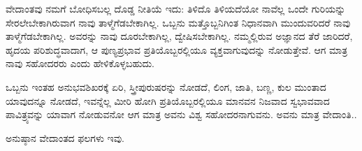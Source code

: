 ವೇದಾಂತವು ನಮಗೆ ಬೋಧಿಸಬಲ್ಲ ದೊಡ್ಡ ನೀತಿಯೆ ಇದು: ತಿಳಿದೊ ತಿಳಿಯದೆಯೋ ನಾವೆಲ್ಲ ಒಂದೇ ಗುರಿಯನ್ನು ಸೇರಲೇಬೇಕಾಗಿರುವಾಗ ನಾವು ತಾಳ್ಮೆಗೆಡಬೇಕಾಗಿಲ್ಲ. ಒಬ್ಬನು ಮತ್ತೊಬ್ಬನಿಗಿಂತ ನಿಧಾನವಾಗಿ ಮುಂದುವರಿದರೆ ನಾವು ತಾಳ್ಮೆಗೆಡಬೇಕಾಗಿಲ್ಲ. ಅವರನ್ನು ನಾವು ದೂರಬೇಕಾಗಿಲ್ಲ, ದ್ವೇಷಿಸಬೇಕಾಗಿಲ್ಲ. ನಮ್ಮಲ್ಲಿರುವ ಅಜ್ಞಾನದ ತೆರೆ ಜಾರಿದರೆ, ಹೃದಯ ಪರಿಶುದ್ಧವಾದಾಗ, ಆ ಪುಣ್ಯಪ್ರಭಾವ ಪ್ರತಿಯೊಬ್ಬರಲ್ಲಿಯೂ ವ್ಯಕ್ತವಾಗುವುದನ್ನು ನೋಡುತ್ತೇವೆ. ಆಗ ಮಾತ್ರ ನಾವು ಸಹೋದರರು ಎಂದು ಹೇಳಿಕೊಳ್ಳಬಹುದು.

ಒಬ್ಬನು ಇಂತಹ ಅನುಭವಶಿಖರಕ್ಕೆ ಏರಿ, ಸ್ತ್ರೀಪುರುಷರನ್ನು ನೋಡದೆ, ಲಿಂಗ, ಜಾತಿ, ಬಣ್ಣ, ಕುಲ ಮುಂತಾದ ಯಾವುದನ್ನೂ ನೋಡದೆ, ಇವನ್ನೆಲ್ಲ ಮೀರಿ ಹೋಗಿ ಪ್ರತಿಯೊಬ್ಬರಲ್ಲಿಯೂ ಮಾನವನ ನಿಜವಾದ ಸ್ವಭಾವವಾದ ಪಾವಿತ್ರ್ಯವನ್ನು ಯಾವಾಗ ನೋಡುವನೋ ಆಗ ಮಾತ್ರ ಅವನು ವಿಶ್ವ ಸಹೋದರನಾಗುವನು. ಅವನು ಮಾತ್ರ ವೇದಾಂತಿ..

ಅನುಷ್ಠಾನ ವೇದಾಂತದ ಫಲಗಳು ಇವು.


